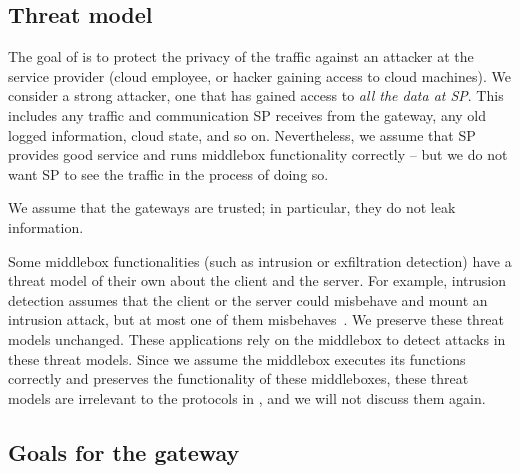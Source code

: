 




\subsection{Threat model}

The goal of \sys is to protect the privacy of the traffic against an attacker at the service provider  
(cloud employee, or hacker gaining access to cloud machines). 
We consider a strong  attacker, one that has gained access to {\em all the data at SP}.
This includes any traffic and communication SP receives from the 
gateway, any old logged information, cloud state, and so on. Nevertheless, we assume that 
SP provides good service and runs middlebox functionality correctly -- but we do not want SP to 
see the traffic in the process of doing so.  

We assume that the gateways are trusted; in particular,  they do not leak information.


Some middlebox functionalities (such as intrusion or exfiltration detection) have a threat model
of their own about the client and the server. For example, intrusion detection assumes that 
the client or the server could misbehave and mount an intrusion attack, but at most one of them misbehaves~\cite{Bro}.  
We preserve these threat models unchanged. These applications rely
on the middlebox to detect attacks in these threat models. Since we assume the middlebox executes
its functions correctly and \sys preserves the functionality of these middleboxes, 
these threat models are irrelevant to the protocols in \sys, and we will not discuss them again. 


\subsection{Goals for the gateway}

